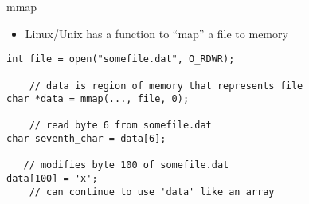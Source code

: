 \begin{frame}[fragile,label=mmap]{mmap}
\lstset{
    language=C,
    style=small
}
\begin{itemize}
\item Linux/Unix has a function to ``map'' a file to memory
\end{itemize}
\begin{lstlisting}
int file = open("somefile.dat", O_RDWR);

    // data is region of memory that represents file
char *data = mmap(..., file, 0);

    // read byte 6 from somefile.dat
char seventh_char = data[6];

   // modifies byte 100 of somefile.dat
data[100] = 'x';
    // can continue to use 'data' like an array
\end{lstlisting}
\end{frame}

